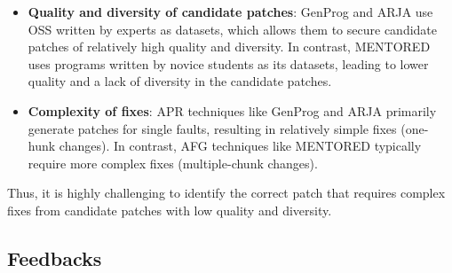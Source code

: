 \documentclass[10pt,conference]{IEEEtran}
\begin{document}
        \begin{itemize}
            \item \textbf{Quality and diversity of candidate patches}: GenProg and ARJA use OSS written by experts as datasets, which allows them to secure candidate patches of relatively high quality and diversity. In contrast, MENTORED uses programs written by novice students as its datasets, leading to lower quality and a lack of diversity in the candidate patches.
            
            \item \textbf{Complexity of fixes}: APR techniques like GenProg and ARJA primarily generate patches for single faults, resulting in relatively simple fixes (one-hunk changes). In contrast, AFG techniques like MENTORED typically require more complex fixes (multiple-chunk changes).
        \end{itemize}

        Thus, it is highly challenging to identify the correct patch that requires complex fixes from candidate patches with low quality and diversity.


    \subsection{Feedbacks} \label{Feedback}
            
\end{document}
